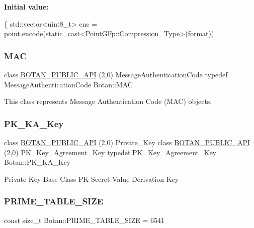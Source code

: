 {\bfseries Initial value\+:}
\begin{DoxyCode}
\{
   std::vector<uint8\_t> enc = point.encode(static\_cast<PointGFp::Compression\_Type>(format))
\end{DoxyCode}
\mbox{\label{namespace_botan_aad9020384b0dc79f1bc8dcc59d5ee6fc}} 
\subsubsection{\texorpdfstring{M\+AC}{MAC}}
{\footnotesize\ttfamily class \hyperlink{namespace_botan_a6b9388030d872e586a4655b776ac9501}{B\+O\+T\+A\+N\+\_\+\+P\+U\+B\+L\+I\+C\+\_\+\+A\+PI} (2,0) Message\+Authentication\+Code typedef Message\+Authentication\+Code Botan\+::\+M\+AC}

This class represents Message Authentication Code (M\+AC) objects. \mbox{\label{namespace_botan_a137fc6f2c61b1ee506513b92b09618c6}} 
\subsubsection{\texorpdfstring{P\+K\+\_\+\+K\+A\+\_\+\+Key}{PK\_KA\_Key}}
{\footnotesize\ttfamily class \hyperlink{namespace_botan_a6b9388030d872e586a4655b776ac9501}{B\+O\+T\+A\+N\+\_\+\+P\+U\+B\+L\+I\+C\+\_\+\+A\+PI} (2,0) Private\+\_\+\+Key class \hyperlink{namespace_botan_a6b9388030d872e586a4655b776ac9501}{B\+O\+T\+A\+N\+\_\+\+P\+U\+B\+L\+I\+C\+\_\+\+A\+PI} (2,0) P\+K\+\_\+\+Key\+\_\+\+Agreement\+\_\+\+Key typedef P\+K\+\_\+\+Key\+\_\+\+Agreement\+\_\+\+Key Botan\+::\+P\+K\+\_\+\+K\+A\+\_\+\+Key}

Private Key Base Class PK Secret Value Derivation Key \mbox{\label{namespace_botan_a501e4632aed1ca4799b03efff7dc59d7}} 
\subsubsection{\texorpdfstring{P\+R\+I\+M\+E\+\_\+\+T\+A\+B\+L\+E\+\_\+\+S\+I\+ZE}{PRIME\_TABLE\_SIZE}}
{\footnotesize\ttfamily const size\+\_\+t Botan\+::\+P\+R\+I\+M\+E\+\_\+\+T\+A\+B\+L\+E\+\_\+\+S\+I\+ZE = 6541}

